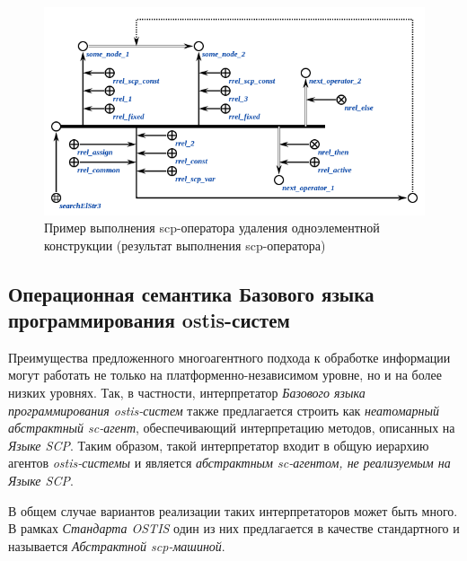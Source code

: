 \begin{figure}[H]
	\centering
	\includegraphics[scale=0.8]{images/part3/chapter_situation_management/searchElStr3_faf_2.png}
	\caption{Пример выполнения scp-оператора удаления одноэлементной конструкции (результат выполнения scp-оператора)}
	\label{fig:erase_edge_2}
\end{figure}

\subsection{Операционная семантика Базового языка программирования ostis-систем}

Преимущества предложенного многоагентного подхода к обработке информации могут работать не только на платформенно-независимом уровне, но и на более низких уровнях. Так, в частности, интерпретатор \textit{Базового языка программирования ostis-систем} также предлагается строить как \textit{неатомарный абстрактный sc-агент}, обеспечивающий интерпретацию методов, описанных на \textit{Языке SCP}. Таким образом, такой интерпретатор входит в общую иерархию агентов \textit{ostis-системы} и является \textit{абстрактным sc-агентом, не реализуемым на Языке SCP}.

В общем случае вариантов реализации таких интерпретаторов может быть много. В рамках \textit{Стандарта OSTIS} один из них предлагается в качестве стандартного и называется \textit{Абстрактной scp-машиной}.

